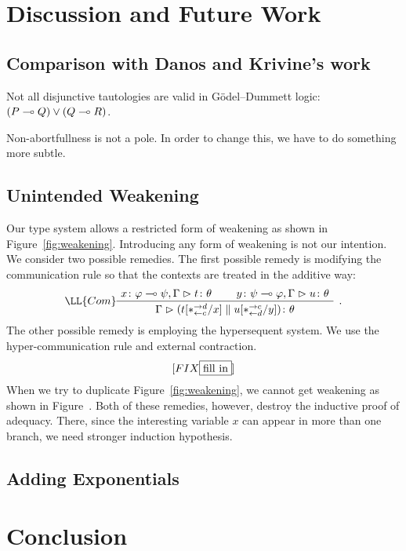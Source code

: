 \section{Discussion and Future Work}

\subsection{Comparison with Danos and Krivine's work}



Not all disjunctive tautologies are valid in G\"odel--Dummett logic:
$(P\multimap Q)\lor(Q\multimap R)$.

Non-abortfullness is not a pole.
In order to change this, we have to do something more subtle.

\subsection{Unintended Weakening}

Our type system allows a restricted form of weakening as shown in
Figure~\ref{fig:weakening}.  Introducing any form of weakening is not
our intention.  We consider two possible remedies.  The first possible
remedy is modifying the communication rule so that the contexts are
treated in the additive way:
\[
\aseq{\tj{x}{\phi\limp\psi},\G}{\tj t\theta}
\aseq{\tj{y}{\psi\limp\phi},\G}{\tj u\theta}
\LL{Com}
\bseq{\G}{\tj{(t[\comodL/x]\conc u[\comodR/y])}{\theta}}
\DisplayProof\enspace.
\]
The other possible remedy is employing the hypersequent system.  We use
the hyper-communication rule and external contraction.
\[
 [FIX \fbox{fill in}]
\]
When we try to
duplicate Figure~\ref{fig:weakening}, we cannot get weakening as shown
in Figure~.
Both of these remedies, however, destroy the inductive proof of
adequacy.  There, since the
interesting variable $x$ can appear in more than one branch,
we need stronger induction hypothesis.

\subsection{Adding Exponentials}

\section{Conclusion}
